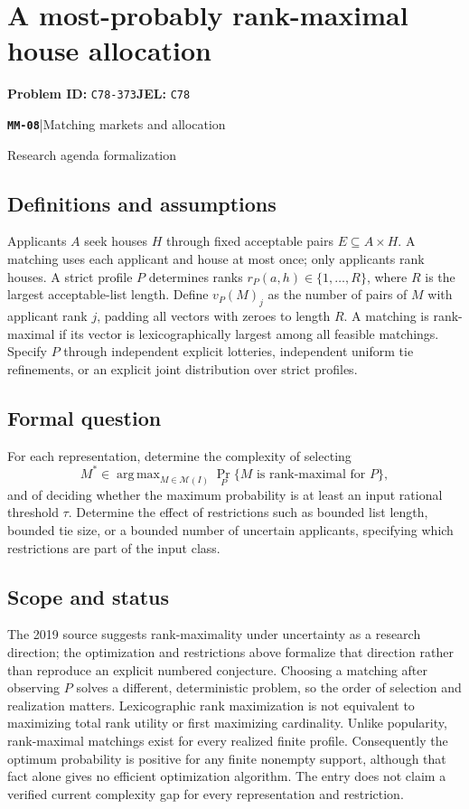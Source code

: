 \documentclass[11pt,a4paper]{article}
\DeclareMathOperator*{\argmax}{arg\,max}
\newcommand{\entrymeta}[3]{{\sffamily\small\color{muted}\textbf{\texttt{#1}}\quad|\quad #2\par #3\par}}
\begin{document}
\section*{A most-probably rank-maximal house allocation}
\textbf{Problem ID:} \texttt{C78-373}\quad \textbf{JEL:} \texttt{C78}\par
\label{problem:OP-0549}
\label{beyond:MM-08}
\entrymeta{MM-08}{Matching markets and allocation}{Research agenda formalization}
\subsection*{Definitions and assumptions}
Applicants $A$ seek houses $H$ through fixed acceptable pairs $E\subseteq A\times H$. A matching uses each applicant and house at most once; only applicants rank houses. A strict profile $P$ determines ranks $r_P(a,h)\in\{1,\ldots,R\}$, where $R$ is the largest acceptable-list length. Define $v_P(M)_j$ as the number of pairs of $M$ with applicant rank $j$, padding all vectors with zeroes to length $R$. A matching is rank-maximal if its vector is lexicographically largest among all feasible matchings. Specify $P$ through independent explicit lotteries, independent uniform tie refinements, or an explicit joint distribution over strict profiles.
\subsection*{Formal question}
For each representation, determine the complexity of selecting
\[
 M^*\in\argmax_{M\in\mathcal M(I)}
 \Pr_P\{M\text{ is rank-maximal for }P\},
\]
and of deciding whether the maximum probability is at least an input rational threshold $\tau$. Determine the effect of restrictions such as bounded list length, bounded tie size, or a bounded number of uncertain applicants, specifying which restrictions are part of the input class.
\subsection*{Scope and status}
The 2019 source suggests rank-maximality under uncertainty as a research direction; the optimization and restrictions above formalize that direction rather than reproduce an explicit numbered conjecture. Choosing a matching after observing $P$ solves a different, deterministic problem, so the order of selection and realization matters. Lexicographic rank maximization is not equivalent to maximizing total rank utility or first maximizing cardinality. Unlike popularity, rank-maximal matchings exist for every realized finite profile. Consequently the optimum probability is positive for any finite nonempty support, although that fact alone gives no efficient optimization algorithm. The entry does not claim a verified current complexity gap for every representation and restriction.
\end{document}

